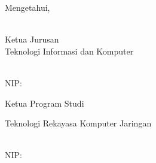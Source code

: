 \vspace*{1cm}
\noindent 
\tabto{5.8cm}Mengetahui,\\
\\
\noindent \begin{minipage}[t]{0.45\linewidth}
\noindent
Ketua Jurusan\\
Teknologi Informasi dan Komputer
  
\vspace*{2cm}
\textbf{\kajur} \\
NIP: \nipKajur
\end{minipage}
\hspace{0.1\linewidth}
\begin{minipage}[t]{0.60\linewidth}
    \noindent
    Ketua Program Studi\\
    \raggedright Teknologi Rekayasa Komputer Jaringan
    
    \vspace*{2cm}
    \textbf{\kaprodi} \\
    NIP: \nipKaprodi
  \end{minipage}
  
  

